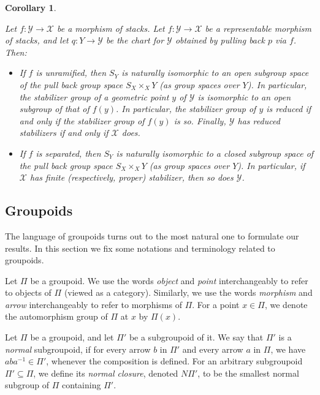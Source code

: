 \documentclass{amsart}
\newtheorem{cor}[thm]{Corollary}
\theoremstyle{definition}
\theoremstyle{remark}
\theoremstyle{remark}
\newcommand{\X}{\mathcal{X}}
\newcommand{\Y}{\mathcal{Y}}
\newcommand{\x}{\times}
\let\:=\colon
\begin{document}
\begin{cor}{\label{P4.9}}

Let $f \: \Y \to \X$ be a morphism of stacks. Let $f \: \Y \to \X$
be a representable morphism of stacks, and let $q \: Y \to \Y$ be
the chart for $\Y$ obtained by pulling back $p$ via $f$. Then:

\begin{itemize}
\item[$\mathbf{i})$]  If $f$ is unramified, then $S_Y$ is naturally
isomorphic to an open subgroup space of the pull back group space
$S_X \x_X Y$ (as group spaces over $Y$). In particular, the
stabilizer group of a geometric point $y$ of $\Y$ is isomorphic to
an open subgroup of that of $f(y)$. In particular, the stabilizer
group of $y$ is reduced if and only if the stabilizer group of
$f(y)$ is so. Finally, $\Y$ has reduced stabilizers if and only if
$\X$ does.

\item[$\mathbf{ii})$] If $f$ is separated, then $S_Y$ is naturally
isomorphic to a closed subgroup space of the pull back group space
$S_X \x_X Y$ (as group spaces over $Y$). In particular, if $\X$
has finite (respectively, proper) stabilizer, then so does $\Y$.
\end{itemize}
\end{cor}

\subsection{Groupoids}{\label{S:groupoid}}

The language of groupoids turns out to the most natural one to
formulate our results. In this section we fix some notations and
terminology related to groupoids.

Let $\Pi$ be a groupoid. We use the words {\em object} and {\em
point} interchangeably to refer to objects of $\Pi$ (viewed as a
category). Similarly, we use the words {\em morphism} and {\em
arrow} interchangeably to refer to morphisms of $\Pi$. For a point
$x \in \Pi$, we denote the automorphism group of $\Pi$ at $x$ by
$\Pi(x)$.

Let $\Pi$ be a groupoid, and let $\Pi'$ be a subgroupoid of it. We
say that $\Pi'$ is a {\sl normal} subgroupoid, if for every  arrow
$b$ in $\Pi'$ and every arrow $a$ in $\Pi$, we have $aba^{-1} \in
\Pi'$, whenever the composition is defined. For an arbitrary
subgroupoid $\Pi' \subseteq \Pi$, we define its {\sl normal
closure}, denoted $N\Pi'$, to be the smallest normal subgroup of
$\Pi$ containing $\Pi'$.
\end{document}
